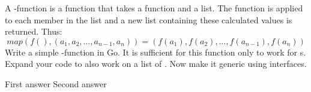\begin{Exercise}[title={Map function},difficulty=4]
A -function is a function that takes
a function and a list. The function is applied to 
each member in the list and a new list containing
these calculated values is returned.
Thus: 
$$ map(f(), (a_1,a_2,\ldots,a_{n-1},a_n)) =  (f(a_1), f(a_2),\ldots,f(a_{n-1}), f(a_n)) $$
\Question Write a simple -function in Go. It is sufficient
for this function only to work for s.
\Question Expand your code to also work on a list of .
\Question Now make it generic using interfaces.

\end{Exercise}

\begin{Answer}
First answer
Second answer


\end{Answer}


